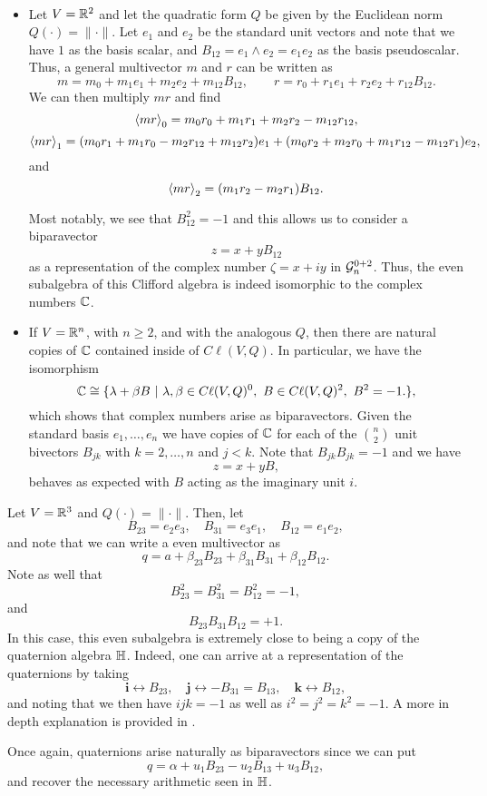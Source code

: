 \begin{example}~
\begin{itemize}
    \item Let $V=\R^2$ and let the quadratic form $Q$ be given by the Euclidean norm $Q(\cdot)=\|\cdot\|$.  Let $e_1$ and $e_2$ be the standard unit vectors and note that we have $1$ as the basis scalar, and $B_{12} = e_1\wedge e_2 = e_1e_2$ as the basis pseudoscalar.  Thus, a general multivector $m$ and $r$ can be written as
\[
m = m_0 + m_1 e_1 + m_2 e_2 + m_{12} B_{12}, \qquad r = r_0 +r_1 e_1 + r_2 e_2 + r_{12}B_{12}.
\]
We can then multiply $mr$ and find
\[
\proj{0}{mr} = m_0r_0 + m_1 r_1 + m_2 r_2 - m_{12}r_{12},
\]
\[
\proj{1}{mr} = (m_0 r_1 + m_1 r_0 - m_2 r_{12} + m_{12} r_2) e_1 + (m_0 r_2 + m_2 r_0 + m_1r_{12} - m_{12} r_1) e_2,
\]
and
\[
\proj{2}{mr} = (m_1r_2 - m_2 r_1)B_{12}.
\]

Most notably, we see that $B_{12}^2=-1$ and this allows us to consider a biparavector
\[
z = x + y B_{12} 
\]
as a representation of the complex number $\zeta = x+ iy$ in $\G_n^{0+2}$.  Thus, the even subalgebra of this Clifford algebra is indeed isomorphic to the complex numbers $\C$. 

    \item If $V =\R^n$, with $n\geq 2$, and with the analogous $Q$, then there are natural copies of $\C$ contained inside of $C\ell(V,Q)$. In particular, we have the isomorphism
    \[
        \C \cong \{\lambda + \beta B ~\vert~ \lambda,\beta \in C\ell(V,Q)^0,~ B \in C\ell(V,Q)^2,~ B^2=-1. \},
    \]
   which shows that complex numbers arise as biparavectors. Given the standard basis $e_1,\dots,e_n$ we have copies of $\C$ for each of the ${ n \choose 2}$ unit bivectors $B_{jk}$ with $k=2,\dots,n$ and $j<k$. Note that $B_{jk}B_{jk}=-1$ and we have
    \[
        z = x + yB,
    \]
    behaves as expected with $B$ acting as the imaginary unit $i$.
\end{itemize}
\end{example}

\begin{example}
\label{ex:quaternions}
Let $V=\R^3$ and $Q(\cdot)=\|\cdot \|$.  Then, let
\[
B_{23} = e_2 e_3, \quad B_{31} = e_3 e_1, \quad B_{12} = e_1 e_2,
\]
and note that we can write a even multivector as
\[
q = a + \beta_{23} B_{23} + \beta_{31} B_{31} + \beta_{12} B_{12}.
\]
Note as well that
\[
B_{23}^2 = B_{31}^2 = B_{12}^2 = -1,
\]
and
\[
B_{23}B_{31}B_{12} = +1.
\]
In this case, this even subalgebra is extremely close to being a copy of the quaternion algebra $\quat$. Indeed, one can arrive at a representation of the quaternions by taking
\[
\boldsymbol{i} \leftrightarrow B_{23}, \quad \boldsymbol{j} \leftrightarrow -B_{31}=B_{13}, \quad \boldsymbol{k} \leftrightarrow B_{12},
\]
and noting that we then have $ijk=-1$ as well as $i^2=j^2=k^2=-1$. A more in depth explanation is provided in \cite{doran_geometric_2003}.

Once again, quaternions arise naturally as biparavectors since we can put
\[
q= \alpha + u_1B_{23} - u_2 B_{13} + u_3 B_{12},
\]
and recover the necessary arithmetic seen in $\quat$.
\end{example}


